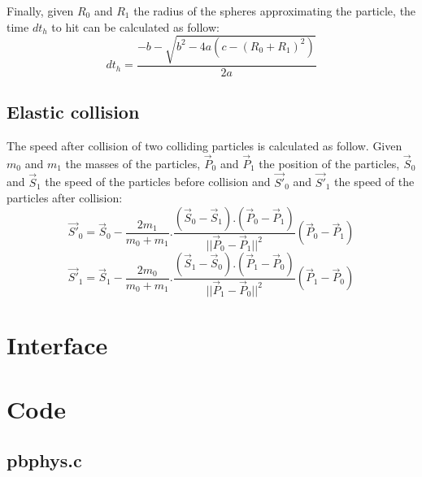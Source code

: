 Finally, given $R_0$ and $R_1$ the radius of the spheres approximating the particle, the time $dt_h$ to hit can be calculated as follow:\\
\begin{equation}
dt_h=\frac{-b-\sqrt{b^2-4a(c-(R_0+R_1)^2)}}{2a}
\end{equation}

\subsection{Elastic collision}

The speed after collision of two colliding particles is calculated as follow. Given $m_0$ and $m_1$ the masses of the particles, $\overrightarrow{P}_0$ and $\overrightarrow{P}_1$ the position of the particles, $\overrightarrow{S}_0$ and $\overrightarrow{S}_1$ the speed of the particles before collision and $\overrightarrow{S'}_0$ and $\overrightarrow{S'}_1$ the speed of the particles after collision:\\
\begin{equation}
\overrightarrow{S'}_0=\overrightarrow{S}_0-\frac{2m_1}{m_0+m_1}.\frac{(\overrightarrow{S}_0-\overrightarrow{S}_1).(\overrightarrow{P}_0-\overrightarrow{P}_1)}{||\overrightarrow{P}_0-\overrightarrow{P}_1||^2}(\overrightarrow{P}_0-\overrightarrow{P}_1)
\end{equation}
\begin{equation}
\overrightarrow{S'}_1=\overrightarrow{S}_1-\frac{2m_0}{m_0+m_1}.\frac{(\overrightarrow{S}_1-\overrightarrow{S}_0).(\overrightarrow{P}_1-\overrightarrow{P}_0)}{||\overrightarrow{P}_1-\overrightarrow{P}_0||^2}(\overrightarrow{P}_1-\overrightarrow{P}_0)
\end{equation}

\section{Interface}

\begin{scriptsize}
\begin{ttfamily}

\end{ttfamily}
\end{scriptsize}

\section{Code}

\subsection{pbphys.c}

